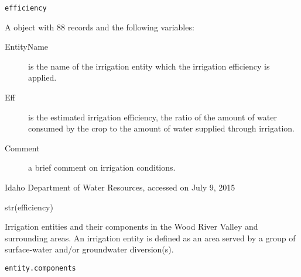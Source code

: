 \documentclass[a4paper]{book}
\begin{document}
%
\begin{Usage}
\begin{verbatim}
efficiency
\end{verbatim}
\end{Usage}
%
\begin{Format}
A  object with 88 records and the following variables:
\begin{description}

\item[EntityName] is the name of the irrigation entity which the irrigation efficiency is applied.
\item[Eff] is the estimated irrigation efficiency, the ratio of the amount of water consumed by the crop to the amount of water supplied through irrigation.
\item[Comment] a brief comment on irrigation conditions.

\end{description}

\end{Format}
%
\begin{Source}\relax
Idaho Department of Water Resources, accessed on July 9, 2015
\end{Source}
%
\begin{Examples}
\begin{ExampleCode}
str(efficiency)
\end{ExampleCode}
\end{Examples}
%
\begin{Description}\relax
Irrigation entities and their components in the Wood River Valley and surrounding areas.
An irrigation entity is defined as an area served by a group of surface-water and/or groundwater diversion(s).
\end{Description}
%
\begin{Usage}
\begin{verbatim}
entity.components
\end{verbatim}
\end{Usage}
%
\end{document}
